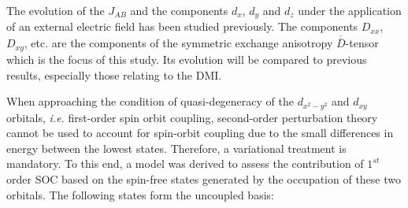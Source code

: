 \documentclass[12pt]{report}
\numberwithin{equation}{section}
\begin{document}
\begin{center}
\end{center}
The evolution of the $J_{AB}$ and the components $d_x$, $d_y$ and $d_z$ under the application of an external electric field has been studied previously.
The components $D_{xx}$, $D_{xy}$, etc. are the components of the symmetric exchange anisotropy $\overline{\overline{D}}$-tensor which is the focus of this study.
Its evolution will be compared to previous results, especially those relating to the DMI.

When approaching the condition of quasi-degeneracy of the $d_{x^2-y^2}$ and $d_{xy}$ orbitals, \textit{i.e.} first-order spin orbit coupling, second-order perturbation theory cannot be used to account for spin-orbit coupling due to the small differences in energy between the lowest states.
Therefore, a variational treatment is mandatory.
To this end, a model was derived to assess the contribution of $1^{st}$ order SOC based on the spin-free states generated by the occupation of these two orbitals.
The following states form the uncoupled basis:
\end{document}
